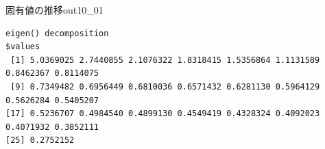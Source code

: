 \begin{Rscreen}{固有値の推移}{out10_01}
	\begin{verbatim}
eigen() decomposition
$values
 [1] 5.0369025 2.7440855 2.1076322 1.8318415 1.5356864 1.1131589 0.8462367 0.8114075
 [9] 0.7349482 0.6956449 0.6810036 0.6571432 0.6281130 0.5964129 0.5626284 0.5405207
[17] 0.5236707 0.4984540 0.4899130 0.4549419 0.4328324 0.4092023 0.4071932 0.3852111
[25] 0.2752152
\end{verbatim}
\end{Rscreen}
